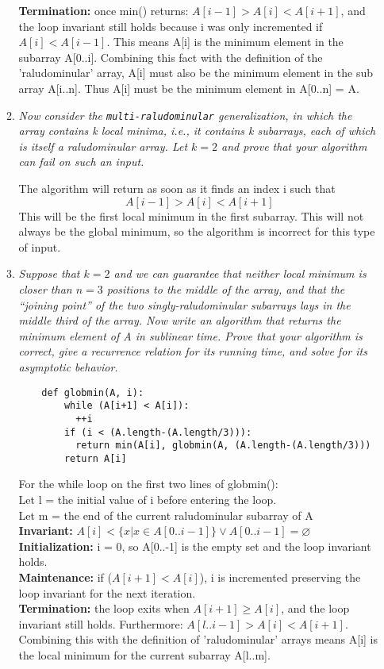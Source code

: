 \documentclass[12pt]{article} \setlength{\oddsidemargin}{0in}
\begin{document}
\begin{enumerate}
\begin{enumerate}
    \textbf{Termination:} once min() returns: $A[i-1] > A[i] < A[i+1]$, and the loop invariant still holds because i was only incremented if $A[i] < A[i-1]$. This means A[i] is the minimum element in the subarray A[0..i]. Combining this fact with the definition of the 'raludominular' array, A[i] must also be the minimum element in the sub array A[i..n]. Thus A[i] must be the minimum element in A[0..n] = A.

    \newpage
    
  \item \textit{Now consider the \texttt{multi-raludominular}
      generalization, in which the array contains k local minima,
      i.e., it contains k subarrays, each of which is itself a
      raludominular array. Let $k = 2$ and prove that your algorithm
      can fail on such an input.}

      \medskip
    The algorithm will return as soon as it finds an index i such that $$A[i-1] > A[i] < A[i+1]$$ This will be the first local minimum in the first subarray. This will not always be the global minimum, so the algorithm is incorrect for this type of input. 

  \newpage 

  \item \textit{Suppose that $k = 2$ and we can guarantee that neither
      local minimum is closer than $n=3$ positions to the middle of
      the array, and that the ``joining point'' of the two
      singly-raludominular subarrays lays in the middle third of the
      array. Now write an algorithm that returns the minimum element
      of A in sublinear time. Prove that your algorithm is correct,
      give a recurrence relation for its running time, and solve for
      its asymptotic behavior.}

    \begin{verbatim}
    def globmin(A, i):
        while (A[i+1] < A[i]):
          ++i
        if (i < (A.length-(A.length/3))):
          return min(A[i], globmin(A, (A.length-(A.length/3)))
        return A[i]
    \end{verbatim}
    
    For the while loop on the first two lines of globmin(): \\
    Let l = the initial value of i before entering the loop. \\
    Let m = the end of the current raludominular subarray of A \\
    \textbf{Invariant:} $A[i] < \{x | x \in A[0..i-1]\} \vee A[0..i-1] = \varnothing$ \\
    \textbf{Initialization:} i = 0, so A[0..-1] is the empty set and the loop invariant holds. \\
    \textbf{Maintenance:} if ($A[i+1] < A[i]$), i is incremented preserving the loop invariant for the next iteration. \\
    \textbf{Termination:} the loop exits when $A[i+1] \geq A[i]$, and the loop invariant still holds. Furthermore: $A[l..i-1] > A[i] < A[i+1]$. Combining this with the definition of 'raludominular' arrays means A[i] is the local minimum for the current subarray A[l..m]. 


\end{enumerate}
\end{enumerate}
\end{document}
